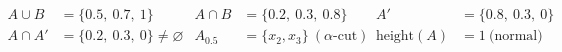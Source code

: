 \begin{formulas}
\begin{align*}
A \cup B &= \{0.5,\ 0.7,\ 1\} & A \cap B &= \{0.2,\ 0.3,\ 0.8\} & A' &= \{0.8,\ 0.3,\ 0\}\\
A \cap A' &= \{0.2,\ 0.3,\ 0\} \ne \varnothing & A_{0.5} &= \{x_2, x_3\}\ (\alpha\text{-cut}) & \text{height}(A) &= 1\ \text{(normal)}
\end{align*}
\end{formulas}
